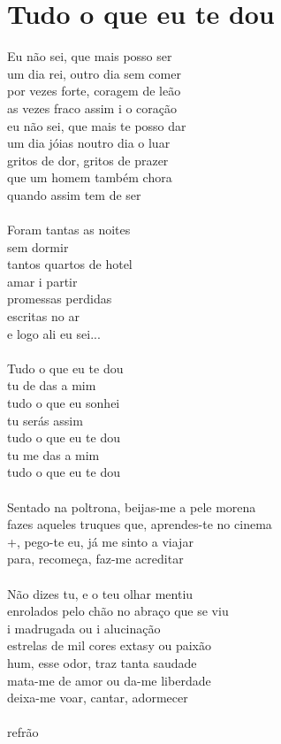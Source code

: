 \documentclass{article}
\begin{document}
\section{ Tudo o que eu te dou}
Eu não sei, que mais posso ser\\
um dia rei, outro dia sem comer\\
por vezes forte, coragem de leão\\
as vezes fraco assim i o coração\\
eu não sei, que mais te posso dar\\
um dia jóias noutro dia o luar\\
gritos de dor, gritos de prazer\\
que um homem também chora\\
quando assim tem de ser\\
\\
Foram tantas as noites\\
sem dormir\\
tantos quartos de hotel\\
amar i partir\\
promessas perdidas\\
escritas no ar\\
e logo ali eu sei...\\
\\
Tudo o que eu te dou\\
tu de das a mim\\
tudo o que eu sonhei\\
tu serás assim\\
tudo o que eu te dou\\
tu me das a mim\\
tudo o que eu te dou\\
\\
Sentado na poltrona, beijas-me a pele morena\\
fazes aqueles truques que, aprendes-te no cinema\\
+, pego-te eu, já me sinto a viajar\\
para, recomeça, faz-me acreditar\\
\\
Não dizes tu, e o teu olhar mentiu\\
enrolados pelo chão no abraço que se viu\\
i madrugada ou i alucinação\\
estrelas de mil cores extasy ou paixão\\
hum, esse odor, traz tanta saudade\\
mata-me de amor ou da-me liberdade\\
deixa-me voar, cantar, adormecer\\
\\
refrão\\
\end{document}
